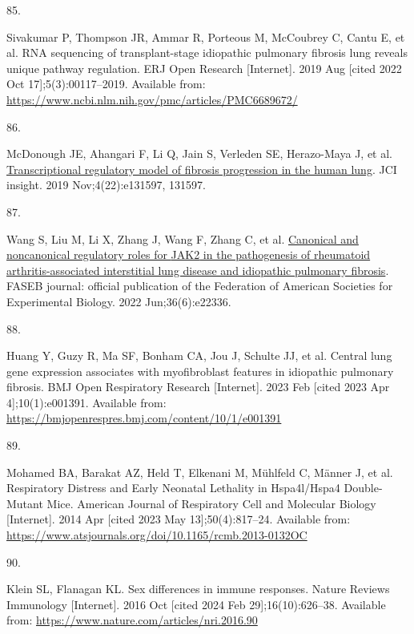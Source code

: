 \documentclass[
]{article}
\newlength{\cslhangindent}
\newlength{\csllabelwidth}
\newenvironment{CSLReferences}[2] %
 {\begin{list}{}{%
  \setlength{\itemindent}{0pt}
  \setlength{\leftmargin}{0pt}
  \setlength{\parsep}{0pt}
  \ifodd #1
   \setlength{\leftmargin}{\cslhangindent}
   \setlength{\itemindent}{-1\cslhangindent}
  \fi
  \setlength{\itemsep}{#2\baselineskip}}}
 {\end{list}}
\newcommand{\CSLLeftMargin}[1]{\parbox[t]{\csllabelwidth}{\strut#1\strut}}
\newcommand{\CSLRightInline}[1]{\parbox[t]{\linewidth - \csllabelwidth}{\strut#1\strut}}
\begin{document}
\begin{CSLReferences}{0}{1}
\CSLLeftMargin{85. }%
\CSLRightInline{Sivakumar P, Thompson JR, Ammar R, Porteous M, McCoubrey C, Cantu E, et al. {RNA} sequencing of transplant-stage idiopathic pulmonary fibrosis lung reveals unique pathway regulation. ERJ Open Research {[}Internet{]}. 2019 Aug {[}cited 2022 Oct 17{]};5(3):00117--2019. Available from: \url{https://www.ncbi.nlm.nih.gov/pmc/articles/PMC6689672/}}

\CSLLeftMargin{86. }%
\CSLRightInline{McDonough JE, Ahangari F, Li Q, Jain S, Verleden SE, Herazo-Maya J, et al. \href{https://doi.org/10.1172/jci.insight.131597}{Transcriptional regulatory model of fibrosis progression in the human lung}. JCI insight. 2019 Nov;4(22):e131597, 131597. }

\CSLLeftMargin{87. }%
\CSLRightInline{Wang S, Liu M, Li X, Zhang J, Wang F, Zhang C, et al. \href{https://doi.org/10.1096/fj.202101436R}{Canonical and noncanonical regulatory roles for {JAK2} in the pathogenesis of rheumatoid arthritis-associated interstitial lung disease and idiopathic pulmonary fibrosis}. FASEB journal: official publication of the Federation of American Societies for Experimental Biology. 2022 Jun;36(6):e22336. }

\CSLLeftMargin{88. }%
\CSLRightInline{Huang Y, Guzy R, Ma SF, Bonham CA, Jou J, Schulte JJ, et al. Central lung gene expression associates with myofibroblast features in idiopathic pulmonary fibrosis. BMJ Open Respiratory Research {[}Internet{]}. 2023 Feb {[}cited 2023 Apr 4{]};10(1):e001391. Available from: \url{https://bmjopenrespres.bmj.com/content/10/1/e001391}}

\CSLLeftMargin{89. }%
\CSLRightInline{Mohamed BA, Barakat AZ, Held T, Elkenani M, Mühlfeld C, Männer J, et al. Respiratory {Distress} and {Early} {Neonatal} {Lethality} in {Hspa4l}/{Hspa4} {Double}-{Mutant} {Mice}. American Journal of Respiratory Cell and Molecular Biology {[}Internet{]}. 2014 Apr {[}cited 2023 May 13{]};50(4):817--24. Available from: \url{https://www.atsjournals.org/doi/10.1165/rcmb.2013-0132OC}}

\CSLLeftMargin{90. }%
\CSLRightInline{Klein SL, Flanagan KL. Sex differences in immune responses. Nature Reviews Immunology {[}Internet{]}. 2016 Oct {[}cited 2024 Feb 29{]};16(10):626--38. Available from: \url{https://www.nature.com/articles/nri.2016.90}}


\end{CSLReferences}
\end{document}
